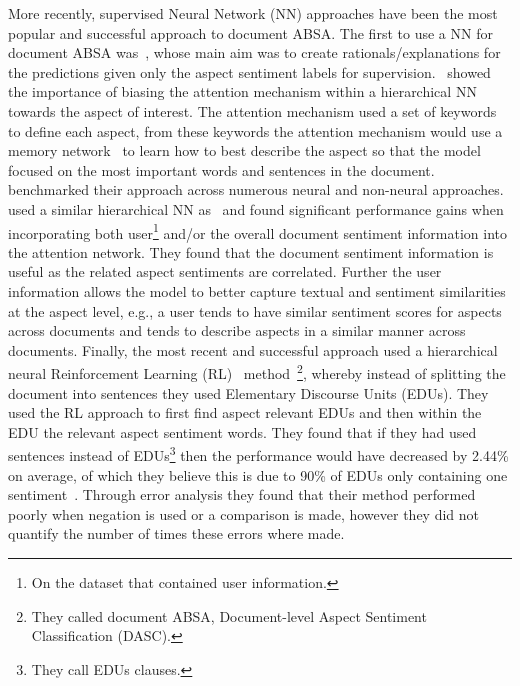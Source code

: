 More recently, supervised Neural Network (NN) approaches have been the most popular and successful approach to document ABSA. The first to use a NN for document ABSA was~\citet{lei-etal-2016-rationalizing}, whose main aim was to create rationals/explanations for the predictions given only the aspect sentiment labels for supervision.~\citet{yin-etal-2017-document} showed the importance of biasing the attention mechanism within a hierarchical NN~\citep{yang-etal-2016-hierarchical} towards the aspect of interest. The attention mechanism used a set of keywords to define each aspect, from these keywords the attention mechanism would use a memory network~\citep{weston2014memory} to learn how to best describe the aspect so that the model focused on the most important words and sentences in the document.~\citet{yin-etal-2017-document} benchmarked their approach across numerous neural and non-neural approaches.~\citet{li-etal-2018-document} used a similar hierarchical NN as~\citet{yin-etal-2017-document} and found significant performance gains when incorporating both user\footnote{On the dataset that contained user information.} and/or the overall document sentiment information into the attention network. They found that the document sentiment information is useful as the related aspect sentiments are correlated. Further the user information allows the model to better capture textual and sentiment similarities at the aspect level, e.g., a user tends to have similar sentiment scores for aspects across documents and tends to describe aspects in a similar manner across documents. Finally, the most recent and successful approach used a hierarchical neural Reinforcement Learning (RL)~\citep{williams1992simple} method~\citep{wang-etal-2019-human}\footnote{They called document ABSA, Document-level Aspect Sentiment Classification (DASC).}, whereby instead of splitting the document into sentences they used Elementary Discourse Units (EDUs). They used the RL approach to first find aspect relevant EDUs and then within the EDU the relevant aspect sentiment words. They found that if they had used sentences instead of EDUs\footnote{They call EDUs clauses.} then the performance would have decreased by 2.44\% on average, of which they believe this is due to 90\% of EDUs only containing one sentiment~\citep{bayoudhi2015sentiment}. Through error analysis they found that their method performed poorly when negation is used or a comparison is made, however they did not quantify the number of times these errors where made.

